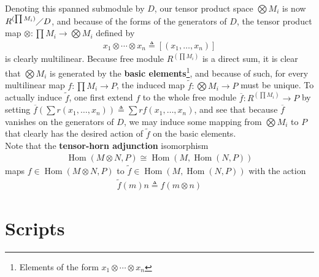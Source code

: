 \documentclass{report}
\begin{document}
Denoting this spanned submodule by $D$, our tensor product space $\bigotimes M_i$ is now $R^{(\prod M_i)}\diagup D$, and because of the forms of the generators of $D$, the tensor product map $\otimes  :\prod M_i \rightarrow \bigotimes  M_i$ defined by 
\begin{align*}
x_1\otimes  \cdots \otimes  x_n \triangleq [(x_1,\dots ,x_n)] 
\end{align*}
is clearly multilinear. Because free module $R^{(\prod M_i)}$ is a direct sum, it is clear that $\bigotimes M_i$ is generated by the \textbf{basic elements}\footnote{Elements of the form $x_1\otimes  \cdots \otimes  x_n$}, and because of such, for every multilinear map $f:\prod M_i \rightarrow P$, the induced map $\tilde{f}: \bigotimes M_i \rightarrow P$ must be unique. To actually induce $\tilde{f}$, one first extend $f$ to the whole free module $\overline{f}:R^{(\prod M_i)}\rightarrow P$ by setting $\overline{f}(\sum r (x_1,\dots ,x_n))\triangleq \sum rf(x_1,\dots ,x_n)$, and see that because $\overline{f}$ vanishes on the generators of $D$, we may induce some mapping from $\bigotimes M_i$ to $P$ that clearly has the desired action of $\tilde{f}$ on the basic elements. \\

Note that the \textbf{tensor-horn adjunction} isomorphism 
\begin{align*}
\operatorname{Hom}(M\otimes N,P) \cong  \operatorname{Hom}(M,\operatorname{Hom}(N,P))
\end{align*}
maps $f \in \operatorname{Hom}(M\otimes N,P)$ to   $\tilde{f}\in \operatorname{Hom}(M,\operatorname{Hom}(N,P))$ with the action
\begin{align*}
  \tilde{f}(m)n\triangleq f(m\otimes n)
\end{align*}
\chapter{Scripts}
\end{document}

